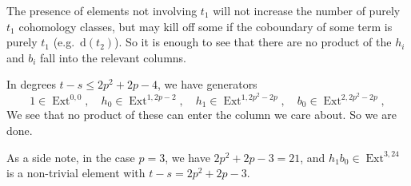 \documentclass{shortart}
\theoremstyle{definition}
\newcommand\dd{\mathrm{d}}
\DeclareMathOperator\Ext{Ext}
\begin{document}
The presence of elements not involving $t_1$ will not increase the number of purely $t_1$ cohomology classes, but may kill off some if the coboundary of some term is purely $t_1$ (e.g.\ $\dd(t_2)$). So it is enough to see that there are no product of the $h_i$ and $b_i$ fall into the relevant columns.

In degrees $t - s \leq 2p^2 + 2p - 4$, we have generators
\[
  1 \in \Ext^{0, 0}, \quad h_0 \in \Ext^{1, 2p - 2},\quad h_1 \in \Ext^{1, 2p^2 - 2p},\quad b_0 \in \Ext^{2, 2p^2 - 2p},
\]
We see that no product of these can enter the column we care about. So we are done.

As a side note, in the case $p = 3$, we have $2p^2 + 2p - 3 = 21$, and $h_1 b_0 \in \Ext^{3, 24}$ is a non-trivial element with $t - s = 2p^2 + 2p - 3$. 
\end{document}
